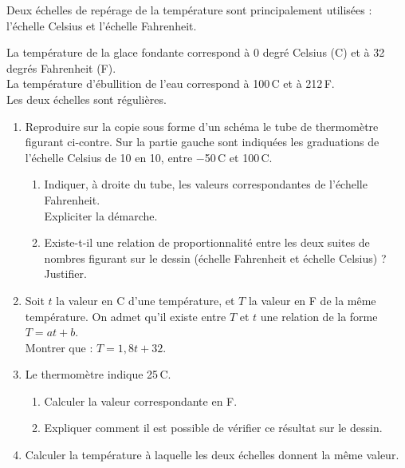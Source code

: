 \bigskip


\begin{exercice}[CRPE 2006 G2] %
   Deux échelles de repérage de la température sont principalement utilisées : l'échelle Celsius et l'échelle Fahrenheit. \\
   \begin{minipage}{13cm}
      La température de la glace fondante correspond à 0 degré Celsius (\degres C) et à 32 degrés Fahrenheit (\degres F). \\
      La température d'ébullition de l'eau correspond à 100\,\degres C et à 212\,\degres F. \\
      Les deux échelles sont régulières.
         \begin{enumerate}
            \item Reproduire sur la copie sous forme d'un schéma le tube de thermomètre figurant ci-contre. Sur la partie gauche sont indiquées les graduations de l'échelle Celsius de 10 en 10, entre $-$50\,\degres C et 100\,\degres C.
               \begin{enumerate}
                  \item Indiquer, à droite du tube, les valeurs correspondantes de l'échelle Fahrenheit. \\
                     Expliciter la démarche.
                  \item Existe-t-il une relation de proportionnalité entre les deux suites de nombres figurant sur le dessin (échelle Fahrenheit et échelle Celsius) ? Justifier.
                \end{enumerate}
          \item Soit $t$ la valeur en \degres C d'une température, et $T$ la valeur en \degres F de la même température. On admet qu'il existe entre $T$ et $t$ une relation de la forme $T =at+b$. \\
            Montrer que : $T =1,8t+32$.
         \item Le thermomètre indique 25\,\degres C.
            \begin{enumerate}
               \item Calculer la valeur correspondante en \degre F.
               \item Expliquer comment il est possible de vérifier ce résultat sur le dessin.
            \end{enumerate}
         \item Calculer la température à laquelle les deux échelles donnent la même valeur. \\

\end{enumerate}
\end{minipage}
\end{exercice}
